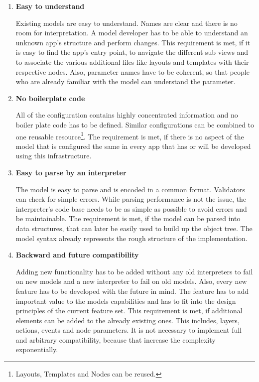 \begin{enumerate}
	\item \textbf{Easy to understand}
	
	Existing models are easy to understand.
	Names are clear and there is no room for interpretation.
	A model developer has to be able to understand an unknown app's structure and perform changes.
	This requirement is met, if it is easy to find the app's entry point, to navigate the different sub views and to associate the various additional files like layouts and templates with their respective nodes.
	Also, parameter names have to be coherent, so that people who are already familiar with the model can understand the parameter.
	
	\item \textbf{No boilerplate code}
	
	All of the configuration contains highly concentrated information and no boiler plate code has to be defined.
	Similar configurations can be combined to one reusable resource\footnote{Layouts, Templates and Nodes can be reused.}.
	The requirement is met, if there is no aspect of the model that is configured the same in every app that has or will be developed using this infrastructure. 
	
	\item \textbf{Easy to parse by an interpreter}
	
	The model is easy to parse and is encoded in a common format.
	Validators can check for simple errors.
	While parsing performance is not the issue, the interpreter's code base needs to be as simple as possible to avoid errors and be maintainable.
	The requirement is met, if the model can be parsed into data structures, that can later be easily used to build up the object tree.
	The model syntax already represents the rough structure of the implementation.
	
	\item \textbf{Backward and future compatibility}
	
	Adding new functionality has to be added without any old interpreters to fail on new models and a new interpreter to fail on old models.
	Also, every new feature has to be developed with the future in mind.
	The feature has to add important value to the models capabilities and has to fit into the design principles of the current feature set.
	This requirement is met, if additional elements can be added to the already existing ones.
	This includes, layers, actions, events and node parameters.
	It is not necessary to implement full and arbitrary compatibility, because that increase the complexity exponentially.
\end{enumerate}

